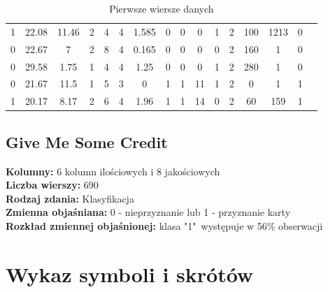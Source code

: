 \documentclass[pl]{minipw} %
\begin{document}
\begin{table}[H]
\caption{Pierwsze wiersze danych}
\label{use_case_tab}
\centering
\begin{tabular}{|c|c|c|c|c|c|c|c|c|c|c|c|c|c|c|c|}
\hline
1  & 22.08  & 11.46  & 2  & 4  & 4  & 1.585  & 0  & 0  & 0  & 1  & 2  & 100  & 1213  & 0\\
0  & 22.67  & 7  & 2  & 8  & 4  & 0.165  & 0  & 0  & 0  & 0  & 2  & 160  & 1  & 0\\
0  & 29.58  & 1.75  & 1  & 4  & 4  & 1.25  & 0  & 0  & 0  & 1  & 2  & 280  & 1  & 0\\
0  & 21.67  & 11.5  & 1  & 5  & 3  & 0  & 1  & 1  & 11  & 1  & 2  & 0  & 1  & 1\\
1  & 20.17  & 8.17  & 2  & 6  & 4  & 1.96  & 1  & 1  & 14  & 0  & 2  & 60  & 159  & 1\\
\hline
\end{tabular}
\end{table}

\section{Give Me Some Credit}

\textbf{Kolumny:} 6 kolumn ilościowych i 8 jakościowych \\
\textbf{Liczba wierszy:} 690 \\
\textbf{Rodzaj zdania:} Klasyfikacja \\
\textbf{Zmienna objaśniana:} 0 - nieprzyznanie lub 1 - przyznanie karty \\
\textbf{Rozkład zmiennej objaśnionej:} klasa "1"\ występuje w 56\% obserwacji \\


\begin{thebibliography}{20}%

\end{thebibliography}



\chapter*{Wykaz symboli i skrótów}
\end{document}
